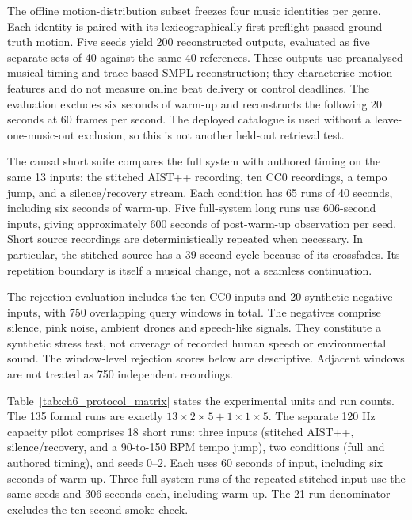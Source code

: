 The offline motion-distribution subset freezes four music identities per genre.
Each identity is paired with its lexicographically first preflight-passed
ground-truth motion. Five seeds yield 200 reconstructed outputs, evaluated as
five separate sets of 40 against the same 40 references. These outputs use
preanalysed musical timing and trace-based SMPL reconstruction; they characterise
motion features and do not measure online beat delivery or control deadlines.
The evaluation excludes six seconds of warm-up and reconstructs the following
20 seconds at 60 frames per second. The deployed catalogue is used without a
leave-one-music-out exclusion, so this is not another held-out retrieval test.

The causal short suite compares the full system with authored timing on the
same 13 inputs: the stitched AIST++ recording, ten CC0 recordings, a tempo jump,
and a silence/recovery stream. Each condition has 65 runs of 40 seconds, including
six seconds of warm-up. Five full-system long runs use 606-second inputs, giving
approximately 600 seconds of post-warm-up observation per seed. Short source
recordings are deterministically repeated when necessary. In particular, the
stitched source has a 39-second cycle because of its crossfades. Its repetition
boundary is itself a musical change, not a seamless continuation.

The rejection evaluation includes the ten CC0 inputs and 20 synthetic negative
inputs, with 750 overlapping query windows in total. The negatives comprise
silence, pink noise, ambient drones and speech-like signals. They constitute a
synthetic stress test, not coverage of recorded human speech or environmental
sound. The window-level rejection scores below are descriptive. Adjacent windows
are not treated as 750 independent recordings.

Table~\ref{tab:ch6_protocol_matrix} states the experimental units and run counts.
The 135 formal runs are exactly $13\times2\times5+1\times1\times5$.
The separate 120 Hz capacity pilot comprises 18 short runs: three inputs
(stitched AIST++, silence/recovery, and a 90-to-150 BPM tempo jump), two
conditions (full and authored timing), and seeds 0--2. Each uses 60 seconds of
input, including six seconds of warm-up. Three full-system runs of the repeated
stitched input use the same seeds and 306 seconds each, including warm-up.
The 21-run denominator excludes the ten-second smoke check.

